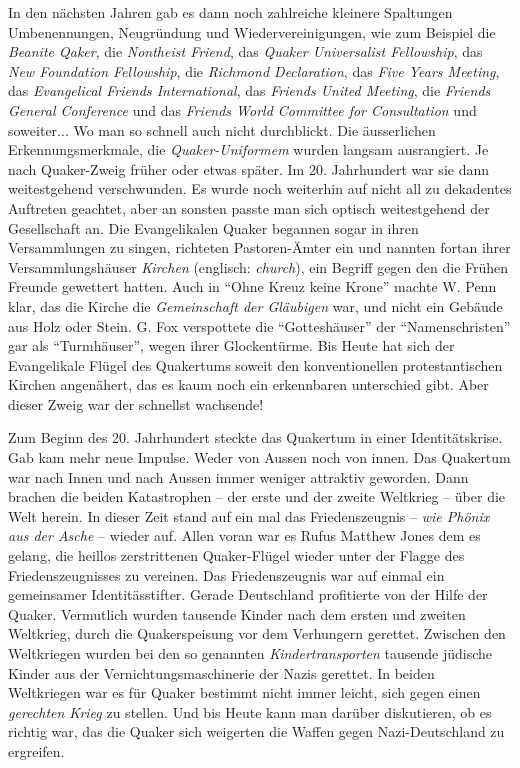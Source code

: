 In den nächsten Jahren gab es dann noch zahlreiche kleinere Spaltungen
Umbenennungen, Neugründung und Wiedervereinigungen, wie zum Beispiel die \textit{Beanite Qaker}, die \textit{Nontheist Friend}, das \textit{Quaker Universalist Fellowship}, das \textit{New Foundation Fellowship}, die \textit{Richmond Declaration}, das \textit{Five Years Meeting}, das \textit{Evangelical Friends International}, das \textit{Friends United Meeting}, die \textit{Friends General Conference} und das \textit{Friends World Committee for Consultation} und soweiter... Wo man so schnell auch nicht durchblickt.
Die äusserlichen Erkennungsmerkmale, die \textit{Quaker-Uniformem} wurden
langsam ausrangiert. Je nach Quaker-Zweig früher oder etwas später. Im 20.
Jahrhundert war sie dann weitestgehend verschwunden. Es wurde noch weiterhin auf
nicht all zu dekadentes Auftreten geachtet, aber an sonsten passte man sich
optisch weitestgehend der Gesellschaft an. Die Evangelikalen Quaker begannen
sogar in ihren Versammlungen zu singen, richteten Pastoren-Ämter ein und nannten
fortan ihrer Versammlungshäuser \textit{Kirchen} (englisch: \textit{church}),
ein Begriff gegen den die Frühen Freunde gewettert hatten. Auch in "`Ohne Kreuz
keine Krone"' machte W. Penn klar, das die Kirche die \textit{Gemeinschaft der
Gläubigen} war, und nicht ein Gebäude aus Holz oder Stein. G. Fox verspottete
die "`Gotteshäuser"' der "`Namenschristen"' gar als "`Turmhäuser"', wegen ihrer
Glockentürme. Bis Heute hat sich der Evangelikale Flügel des Quakertums soweit
den konventionellen protestantischen Kirchen angenähert, das es kaum noch ein
erkennbaren unterschied gibt. Aber dieser Zweig war der schnellst wachsende!

\medskip

Zum Beginn des 20. Jahrhundert steckte das Quakertum in einer Identitätskrise.
Gab kam mehr neue Impulse. Weder von Aussen noch von innen. Das Quakertum war
nach Innen und nach Aussen immer weniger attraktiv geworden. Dann brachen die
beiden Katastrophen -- der erste und der zweite Weltkrieg -- über die Welt
herein. In dieser Zeit stand auf ein mal das Friedenszeugnis -- \textit{wie
Phönix aus der Asche} -- wieder auf. Allen voran war es Rufus Matthew Jones dem
es gelang, die heillos zerstrittenen Quaker-Flügel wieder unter der Flagge des
Friedenszeugnisses zu vereinen. Das Friedenszeugnis war auf einmal ein
gemeinsamer Identitässtifter. Gerade Deutschland profitierte von der Hilfe der
Quaker. Vermutlich wurden tausende Kinder nach dem ersten und zweiten Weltkrieg,
durch die Quakerspeisung vor dem Verhungern gerettet. Zwischen den Weltkriegen
wurden bei den so genannten \textit{Kindertransporten} tausende jüdische Kinder
aus der Vernichtungsmaschinerie der Nazis gerettet. In beiden Weltkriegen war es
für Quaker bestimmt nicht immer leicht, sich gegen einen \textit{gerechten
Krieg} zu stellen. Und bis Heute kann man darüber diskutieren, ob es richtig
war, das die Quaker sich weigerten die Waffen gegen Nazi-Deutschland zu
ergreifen.

